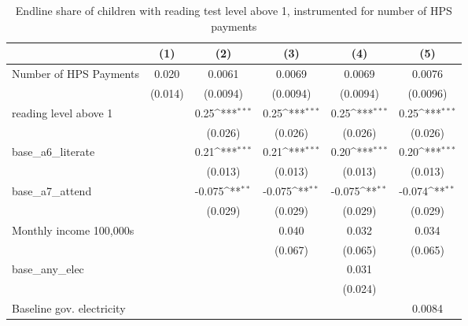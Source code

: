 \begin{table}[htbp]\centering
\def\sym#1{\ifmmode^{#1}\else\(^{#1}\)\fi}
\caption{Endline share of children with reading test level above 1, instrumented for number of HPS payments}
\begin{tabular*}{1\hsize}{@{\hskip\tabcolsep\extracolsep\fill}l*{5}{c}}
\toprule
                &\multicolumn{1}{c}{(1)}         &\multicolumn{1}{c}{(2)}         &\multicolumn{1}{c}{(3)}         &\multicolumn{1}{c}{(4)}         &\multicolumn{1}{c}{(5)}         \\
\midrule
Number of HPS Payments&    0.020         &   0.0061         &   0.0069         &   0.0069         &   0.0076         \\
                &  (0.014)         & (0.0094)         & (0.0094)         & (0.0094)         & (0.0096)         \\
reading level above 1&                  &     0.25\sym{***}&     0.25\sym{***}&     0.25\sym{***}&     0.25\sym{***}\\
                &                  &  (0.026)         &  (0.026)         &  (0.026)         &  (0.026)         \\
base\_a6\_literate&                  &     0.21\sym{***}&     0.21\sym{***}&     0.20\sym{***}&     0.20\sym{***}\\
                &                  &  (0.013)         &  (0.013)         &  (0.013)         &  (0.013)         \\
base\_a7\_attend  &                  &   -0.075\sym{**} &   -0.075\sym{**} &   -0.075\sym{**} &   -0.074\sym{**} \\
                &                  &  (0.029)         &  (0.029)         &  (0.029)         &  (0.029)         \\
Monthly income 100,000s&                  &                  &    0.040         &    0.032         &    0.034         \\
                &                  &                  &  (0.067)         &  (0.065)         &  (0.065)         \\
base\_any\_elec   &                  &                  &                  &    0.031         &                  \\
                &                  &                  &                  &  (0.024)         &                  \\
Baseline gov. electricity&                  &                  &                  &                  &   0.0084         \\

\end{tabular*}
\end{table}
